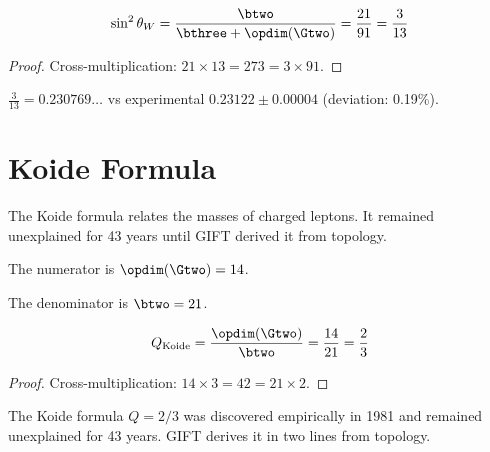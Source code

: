 \begin{theorem}\label{thm:weinberg_angle}
    \leanok
    \[
        \sin^2\theta_W = \frac{\btwo}{\bthree + \opdim(\Gtwo)} = \frac{21}{91} = \frac{3}{13}
    \]
\end{theorem}
\begin{proof}
    Cross-multiplication: $21 \times 13 = 273 = 3 \times 91$.
\end{proof}

\begin{theorem}\label{thm:weinberg_simplified}
    \leanok
    $\frac{3}{13} = 0.230769\ldots$ vs experimental $0.23122 \pm 0.00004$
    (deviation: 0.19\%).
\end{theorem}

\section{Koide Formula}

The Koide formula relates the masses of charged leptons. It remained unexplained
for 43 years until GIFT derived it from topology.

\begin{definition}\label{def:koide_num}
    \leanok
    The numerator is $\opdim(\Gtwo) = 14$.
\end{definition}

\begin{definition}\label{def:koide_den}
    \leanok
    The denominator is $\btwo = 21$.
\end{definition}

\begin{theorem}\label{thm:koide_formula}
    \leanok
    \[
        Q_{\mathrm{Koide}} = \frac{\opdim(\Gtwo)}{\btwo} = \frac{14}{21} = \frac{2}{3}
    \]
\end{theorem}
\begin{proof}
    Cross-multiplication: $14 \times 3 = 42 = 21 \times 2$.
\end{proof}

\begin{remark}
    The Koide formula $Q = 2/3$ was discovered empirically in 1981 and remained
    unexplained for 43 years. GIFT derives it in two lines from topology.
\end{remark}

